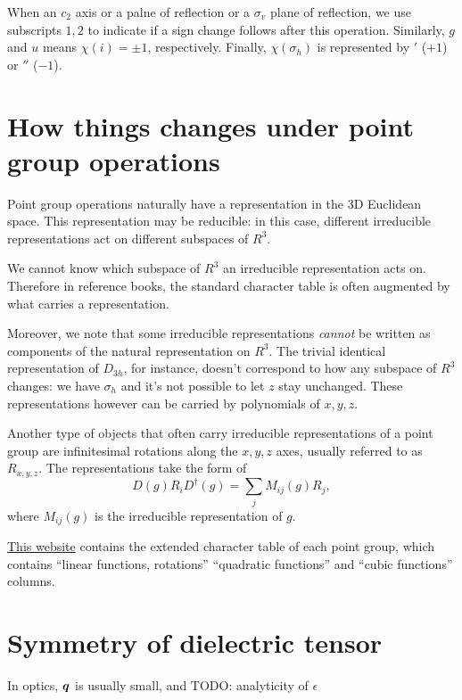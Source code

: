 \documentclass[hyperref, a4paper, 12pt]{article}
\def\mathbb#1{#1}%
\begin{document}
When an $c_2$ axis or a palne of reflection or a $\sigma_v$ plane of reflection,
we use subscripts $1,2$ to indicate if a sign change follows after this operation.
Similarly, $g$ and $u$ means $\chi(i) = \pm 1$, respectively.
Finally, $\chi(\sigma_h)$ is represented by $'$ ($+1$) or $''$ ($-1$).

\section{How things changes under point group operations}\label{sec:how-things-change}

Point group operations naturally have a representation in the 3D Euclidean space.
This representation may be reducible:
in this case, different irreducible representations act on different subspaces of $\mathbb{R}^3$.

We cannot know which subspace of $\mathbb{R}^3$ an irreducible representation acts on.
Therefore in reference books, the standard character table
is often augmented by what carries a representation.

Moreover, we note that some irreducible representations \emph{cannot} be 
written as components of the natural representation on $\mathbb{R}^3$.
The trivial identical representation of $D_{3h}$,
for instance, doesn't correspond to how any subspace of $\mathbb{R}^3$ changes:
we have $\sigma_h$ and it's not possible to let $z$ stay unchanged.
These representations however can be carried by polynomials of $x, y, z$.

Another type of objects that often carry irreducible representations of a point group
are infinitesimal rotations along the $x, y, z$ axes, usually referred to as $R_{x, y, z}$.
The representations take the form of 
\begin{equation}
    D(g) R_i D^\dag(g) = \sum_j M_{ij}(g) R_j,
\end{equation}
where $M_{ij}(g)$ is the irreducible representation of $g$.

\href{http://symmetry.constructor.university/}{This website} 
contains the extended character table of each point group,
which contains ``linear functions, rotations''
``quadratic functions'' and ``cubic functions'' columns.

\section{Symmetry of dielectric tensor}

In optics, $\vb*{q}$ is usually small,
and TODO: analyticity of $\epsilon$
\end{document}
